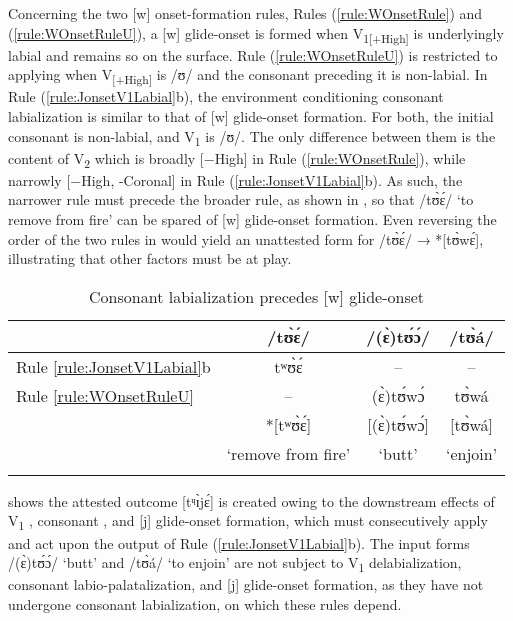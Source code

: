 \documentclass[output=paper,colorlinks,citecolor=brown]{langscibook}
\begin{document}
Concerning the two [w] onset-formation rules, Rules (\ref{rule:WOnsetRule}) and (\ref{rule:WOnsetRuleU}), a [w] glide-onset is formed when V\textsubscript{1[+High]} is underlyingly labial and remains so on the surface. Rule (\ref{rule:WOnsetRuleU}) is restricted to applying when V\textsubscript{[+High]} is /ʊ/ and the consonant preceding it is non-labial. In Rule (\ref{rule:JonsetV1Labial}b), the environment conditioning consonant labialization is similar to that of [w] glide-onset formation. For both, the initial consonant is non-labial, and V\textsubscript{1} is /ʊ/. The only difference between them is the content of V\textsubscript{2} which is broadly [−High] in Rule (\ref{rule:WOnsetRule}), while narrowly [−High, -Coronal] in Rule (\ref{rule:JonsetV1Labial}b). As such, the narrower rule must precede the broader rule, as shown in , so that /tʊ̀ɛ́/ ‘to remove from fire’ can be spared of [w] glide-onset formation. Even reversing the order of the two rules in  would yield an unattested form for /tʊ̀ɛ́/ → *[tʊ̀wɛ́], illustrating that other factors must be at play. 

\begin{table}
\caption{Consonant labialization precedes [w] glide-onset}
\label{tab:Ordering3}
 \begin{tabular}{lccc}
  \lsptoprule
   & /tʊ̀ɛ́/	&/(ɛ̀)tʊ́ɔ́/&	/tʊ̀á/	\\
   \midrule
   Rule \ref{rule:JonsetV1Labial}b & tʷʊ̀ɛ́ & -- & -- \\
   Rule \ref{rule:WOnsetRuleU} & -- & (ɛ̀)tʊ́wɔ́ & tʊ̀wá\\
   \midrule
   & *[tʷʊ̀ɛ́] & [(ɛ̀)tʊ́wɔ́] & [tʊ̀wá] \\
   & `remove from fire' & `butt' & `enjoin' \\
  \lspbottomrule
 \end{tabular}
 \end{table}

 shows the attested outcome [tᶣɪ̀jɛ́] is created owing to the downstream effects of V\textsubscript{1} , consonant , and [j] glide-onset formation, which must consecutively apply and act upon the output of Rule (\ref{rule:JonsetV1Labial}b). The input forms /(ɛ̀)tʊ́ɔ́/ ‘butt’ and /tʊ̀á/ ‘to enjoin’ are not subject to V\textsubscript{1} delabialization, consonant labio-palatalization, and [j] glide-onset formation, as they have not undergone consonant labialization, on which  these rules depend.    
\end{document}
